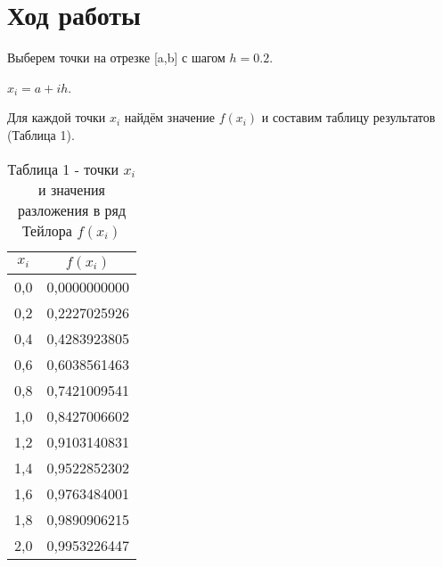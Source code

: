 \documentclass[14pt]{article}
\begin{document}
\section{Ход работы}
Выберем точки на отрезке [a,b] с шагом $h = 0.2$.
\begin{center}
    $x_i = a + i   h$.
\end{center}
Для каждой точки $x_i$ найдём значение $f(x_i)$ и составим таблицу результатов (Таблица 1).
\begin{table}[h]
    \centering
    \begin{tabular}{|c|c|}
        \hline
        $x_i$ & $f(x_i)$\\
        \hline
        0,0 & 0,0000000000\\
        \hline
        0,2 & 0,2227025926\\
        \hline
        0,4 & 0,4283923805\\
        \hline
        0,6 & 0,6038561463\\
        \hline
        0,8 & 0,7421009541\\
        \hline
        1,0 & 0,8427006602\\
        \hline
        1,2 & 0,9103140831\\
        \hline
        1,4 & 0,9522852302\\
        \hline
        1,6 & 0,9763484001\\
        \hline
        1,8 & 0,9890906215\\
        \hline
        2,0 & 0,9953226447\\
        \hline
    \end{tabular}
    \caption*{\small{Таблица 1 - точки $x_i$ и значения разложения в ряд Тейлора $f(x_i)$}}
\end{table}
\end{document}
